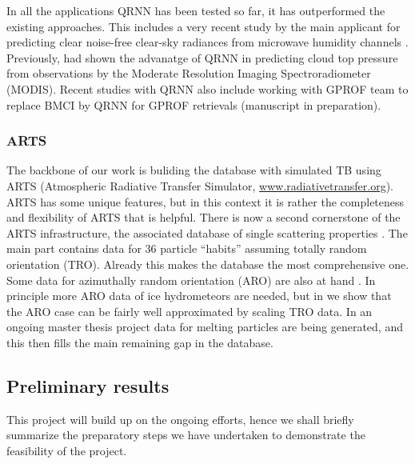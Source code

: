 \documentclass[12pt,oneside,a4paper]{article}
\begin{document}
In all the applications QRNN has been tested so far, it has outperformed the existing approaches. This includes a very recent study by the main applicant for predicting clear noise-free clear-sky radiances from microwave humidity channels \citep{kaur:2021:canma}. Previously, \citet{pfreundschuh:aneur:18} had shown the advanatge of QRNN in predicting cloud top pressure from observations by the Moderate Resolution Imaging Spectroradiometer (MODIS). Recent studies with QRNN also include working with GPROF team  to replace BMCI by QRNN for GPROF retrievals (manuscript in preparation).


\subsubsection{ARTS}
\label{sec:arts}
% 
The backbone of our work is buliding the database with simulated TB using ARTS (Atmospheric Radiative Transfer Simulator, \url{www.radiativetransfer.org}). ARTS has some unique features, but in this context it is rather the completeness and flexibility of ARTS that is
helpful. There is now a second cornerstone of the ARTS infrastructure, the
associated database of single scattering properties \citep{eriksson:agene:18}.
The main part contains data for 36 particle ``habits'' assuming totally random
orientation (TRO). Already this makes the database the most comprehensive one.
Some data for azimuthally random orientation (ARO) are also at hand
\citep{brath:micro:20,ekelund:micro:20}. In principle more ARO data of ice
hydrometeors are needed, but in \citet{baralakas:intro:21} we show that the ARO
case can be fairly well approximated by scaling TRO data. In an ongoing master
thesis project data for melting particles are being generated, and this then
fills the main remaining gap in the database.

\subsection{Preliminary results}
%
This project will build up on the ongoing efforts, hence we shall briefly summarize the preparatory steps we have undertaken to demonstrate the feasibility of the project. 
\end{document}
